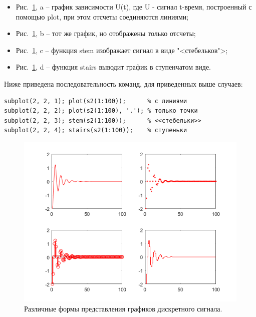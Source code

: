 \documentclass[12pt,a4paper]{article}
\begin{document}
\begin{itemize}
  \item Рис.~\ref{fig:img1}, a -- график зависимости U(t), где U - сигнал t-время, построенный с помощью plot, при этом отсчеты соединяются линиями;
  \item Рис.~\ref{fig:img1}, b -- тот же график, но отображены только отсчеты;
  \item Рис.~\ref{fig:img1}, c -- функция stem изображает сигнал в виде "<стебельков">;
  \item Рис.~\ref{fig:img1}, d -- функция stairs выводит график в ступенчатом виде.
\end{itemize}
Ниже приведена последовательность команд, для приведенных выше случаев:
\begin{verbatim}
subplot(2, 2, 1); plot(s2(1:100));      % с линиями
subplot(2, 2, 2); plot(s2(1:100), '.'); % только точки
subplot(2, 2, 3); stem(s2(1:100));      % <<стебельки>>
subplot(2, 2, 4); stairs(s2(1:100));    % ступеньки
\end{verbatim}
\begin{figure}[!h]
  \centering
  \includegraphics[width=\linewidth]{img1}
  \caption{Различные формы представления графиков дискретного сигнала.}
  \label{fig:img1}
\end{figure}
\end{document}
